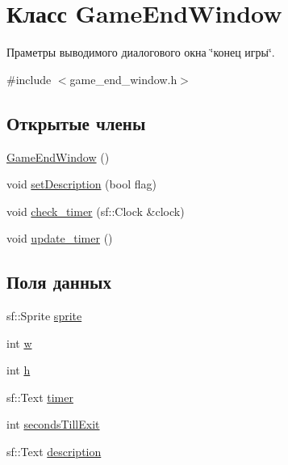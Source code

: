 \hypertarget{classGameEndWindow}{}\section{Класс Game\+End\+Window}
\label{classGameEndWindow}


Праметры выводимого диалогового окна \char`\"{}конец игры\char`\"{}.  




{\ttfamily \#include $<$game\+\_\+end\+\_\+window.\+h$>$}

\subsection*{Открытые члены}
\begin{DoxyCompactItemize}
\item 
\hyperlink{classGameEndWindow_a47971f54545bcf39783852568ccf90ab}{Game\+End\+Window} ()
\item 
void \hyperlink{classGameEndWindow_a2f5dcaf5df932f64323d14f58b5649e6}{set\+Description} (bool flag)
\item 
void \hyperlink{classGameEndWindow_a00ec6d032219c692a678b7ddac55a3b3}{check\+\_\+timer} (sf\+::\+Clock \&clock)
\item 
void \hyperlink{classGameEndWindow_a91d7d99ae0dac923a1bf764f7b5d996f}{update\+\_\+timer} ()
\end{DoxyCompactItemize}
\subsection*{Поля данных}
\begin{DoxyCompactItemize}
\item 
sf\+::\+Sprite \hyperlink{classGameEndWindow_ae1cfd12474c38f65885885c05d3f45da}{sprite}
\item 
int \hyperlink{classGameEndWindow_aec3d8eedb5288ddb2a218d8e2eb0a3b1}{w}
\item 
int \hyperlink{classGameEndWindow_adf2232ddacea4f327e8b1315633f4e4b}{h}
\item 
sf\+::\+Text \hyperlink{classGameEndWindow_a2cda6ea6738d35480ca4ede7fd494fa9}{timer}
\item 
int \hyperlink{classGameEndWindow_a7705716c485ae134468ec5cc3e92812d}{seconds\+Till\+Exit}
\item 
sf\+::\+Text \hyperlink{classGameEndWindow_ab29a8ae98c80ff3facba1c9f58f57ed1}{description}
\end{DoxyCompactItemize}


